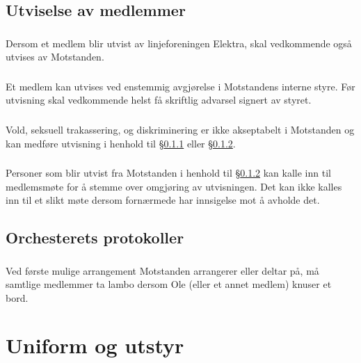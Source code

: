 \documentclass{article}
\newenvironment{statute}[1][]
    {
        \titleformat{\subsubsection}[runin]{\normalfont}{\hspace{1pt}\textit{\S\hspace{5pt}\thesubsubsection}}{0pt}{\rule{4pt}{0pt}}{}
        \subsubsection{}#1
        \begin{minipage}[t]{0.9\linewidth}
    }
    {
        \end{minipage}
        
        \ignorespacesafterend
    }
\begin{document}
        \subsection{Utviselse av medlemmer}
        	\begin{statute}[\label{utvisning_av_elektrastyret}]
        		Dersom et medlem blir utvist av linjeforeningen Elektra, skal vedkommende også utvises av Motstanden.
        	\end{statute}
            \begin{statute}[\label{utvisning_av_styret}]
                Et medlem kan utvises ved enstemmig avgjørelse i Motstandens interne styre. Før utvisning skal vedkommende helst få skriftlig advarsel signert av styret.
            \end{statute}
            \begin{statute}
                Vold, seksuell trakassering, og diskriminering er ikke akseptabelt i Motstanden og kan medføre utvisning i henhold til \S\hspace{3pt}\ref{utvisning_av_elektrastyret} eller  \S\hspace{3pt}\ref{utvisning_av_styret}.
            \end{statute}
			\begin{statute}
				Personer som blir utvist fra Motstanden i henhold til \S\hspace{3pt}\ref{utvisning_av_styret} kan kalle inn til medlemsmøte for å stemme over omgjøring av utvisningen. Det kan ikke kalles inn til et slikt møte dersom fornærmede har innsigelse mot å avholde det.
			\end{statute}

        \subsection{Orchesterets protokoller}
            \begin{statute}
                Ved første mulige arrangement Motstanden arrangerer eller deltar på, må samtlige medlemmer ta lambo dersom Ole (eller et annet medlem) knuser et bord.     
            \end{statute}
        
    \section{Uniform og utstyr}
\end{document}
